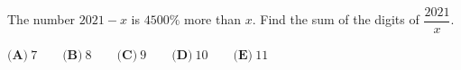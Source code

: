 The number $2021-x$ is $4500\%$ more than $x$. Find the sum of the digits of $\dfrac{2021}{x}$.

$\textbf{(A)}\ 7\qquad\textbf{(B)}\ 8\qquad\textbf{(C)}\ 9\qquad\textbf{(D)}\ 10\qquad\textbf{(E)}\ 11$
